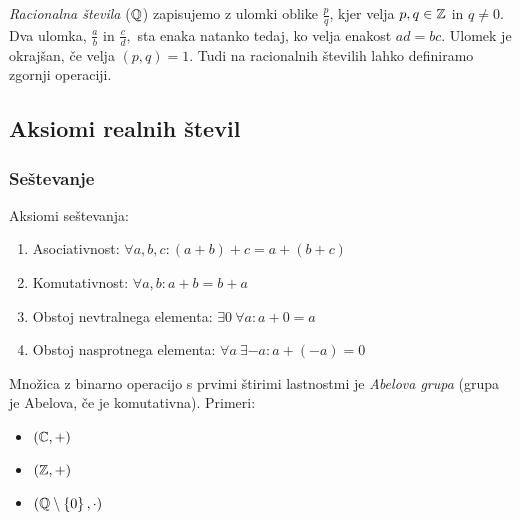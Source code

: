 \documentclass[12pt, a4paper]{article}
\begin{document}
\begin{definicija}
\emph{Racionalna števila} ($\mathbb{Q}$) zapisujemo z ulomki oblike $\frac{p}{q}$, kjer velja $p, q\in\mathbb{Z}$ in $q\ne 0$. Dva ulomka, $\frac{a}{b}$ in $\frac{c}{d},$ sta enaka natanko tedaj, ko velja enakost $ad=bc$. Ulomek je okrajšan, če velja $(p, q)=1$. Tudi na racionalnih številih lahko definiramo zgornji operaciji.
\end{definicija}

\newpage

\subsection{Aksiomi realnih števil}

\subsubsection{Seštevanje}

\begin{okvir}
\begin{definicija}
Aksiomi seštevanja:

\begin{enumerate}[label=A\arabic*:]
\item Asociativnost: $\forall a,b,c\colon(a+b)+c=a+(b+c)$
\item Komutativnost: $\forall a,b\colon a+b=b+a$
\item Obstoj nevtralnega elementa: $\exists 0~\forall a\colon a+0=a$
\item Obstoj nasprotnega elementa: $\forall a~\exists {-a}\colon a+(-a)=0$
\end{enumerate}
\end{definicija}
\end{okvir}

Množica z binarno operacijo s prvimi štirimi lastnostmi je \emph{Abelova grupa} (grupa je Abelova, če je komutativna). Primeri:

\begin{multicols}{3}
\begin{center}
\begin{itemize}
\item $(\mathbb{C},+)$
\item $(\mathbb{Z},+)$
\item $(\mathbb{Q}\setminus\left\{0\right\},\cdot)$
\end{itemize}
\end{center}
\end{multicols}
\end{document}

